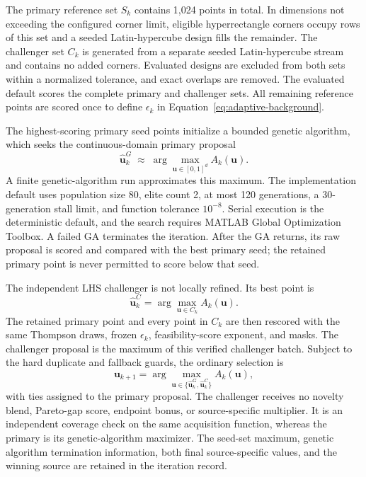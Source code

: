 \documentclass[twoside]{article}
\begin{document}
The primary reference set \(S_k\) contains 1,024 points in total. In
dimensions not exceeding the configured corner limit, eligible hyperrectangle
corners occupy rows of this set and a seeded Latin-hypercube design fills the
remainder. The challenger set \(C_k\) is generated from a separate seeded
Latin-hypercube stream and contains no added corners.  Evaluated designs are
excluded from both sets within a normalized tolerance, and exact overlaps are
removed. The evaluated default scores the complete primary and challenger
sets. All remaining reference points are scored once to define \(\epsilon_k\)
in Equation~\eqref{eq:adaptive-background}.

The highest-scoring primary seed points initialize a bounded genetic
algorithm, which seeks the continuous-domain primary proposal
\begin{equation}
  \widehat{\mathbf{u}}_k^{G}
  \;\approx\;
  \arg\max_{\mathbf{u}\in[0,1]^d} A_k(\mathbf{u}).
  \label{eq:primary-ga-search}
\end{equation}
A finite genetic-algorithm run approximates this maximum. The implementation
default uses population size 80,
elite count 2, at most 120 generations, a 30-generation stall limit, and
function tolerance \(10^{-8}\). Serial execution is the deterministic default,
and the search requires MATLAB Global Optimization Toolbox. A failed GA
terminates the iteration.
After the GA returns, its raw proposal is scored and compared with the best
primary seed; the retained primary point is never permitted to score below
that seed.

The independent LHS challenger is not locally refined.  Its best point is
\begin{equation}
  \widehat{\mathbf{u}}_k^{C}
  =\arg\max_{\mathbf{u}\in C_k}A_k(\mathbf{u}).
  \label{eq:challenger-search}
\end{equation}
The retained primary point and every point in \(C_k\) are then rescored with
the same Thompson draws, frozen \(\epsilon_k\), feasibility-score exponent,
and masks. The challenger proposal is the maximum of this verified challenger
batch. Subject to the hard duplicate and fallback guards, the ordinary
selection is
\begin{equation}
  \mathbf{u}_{k+1}
  =\arg\max_{\mathbf{u}\in
  \{\widehat{\mathbf{u}}_k^{G},\widehat{\mathbf{u}}_k^{C}\}}
  A_k(\mathbf{u}),
  \label{eq:primary-challenger-arbitration}
\end{equation}
with ties assigned to the primary proposal.
The challenger receives no novelty
blend, Pareto-gap score, endpoint bonus, or source-specific multiplier.  It is
an independent coverage check on the same acquisition function, whereas
the primary is its genetic-algorithm maximizer.  The seed-set maximum, genetic
algorithm termination information, both final source-specific values, and the
winning source are retained in the iteration record.
\end{document}
